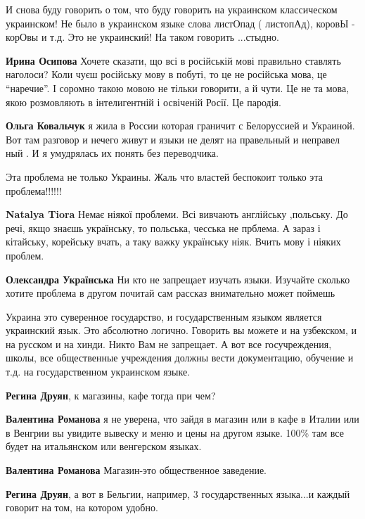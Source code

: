 
И снова буду говорить о том, что буду говорить на украинском классическом
украинском! Не было в украинском языке слова листОпад ( листопАд), коровЫ -
корОвы и т.д. Это не украинский! На таком говорить ...стыдно.

\begin{itemize}

\textbf{Ирина Осипова} Хочете сказати, що всі в російській мові правильно ставлять
наголоси? Коли чуєш російську мову в побуті, то це не російська мова, це
\enquote{наречие}. І соромно такою мовою не тільки говорити, а й чути. Це не та мова,
якою розмовляють в інтелигентній і освіченій Росії. Це пародія.


\textbf{Ольга Ковальчук} я жила в России которая граничит с Белоруссией и Украиной. Вот
там разговор и нечего живут и языки не делят на правельный и неправел ный . И я
умудрялась их понять без переводчика.

\end{itemize}


Эта проблема не только Украины. Жаль что властей беспокоит только эта проблема!!!!!!

\begin{itemize}
\textbf{Natalya Tiora} Немає ніякої проблеми. Всі вивчають англійську
,польську. До речі, якщо знаєшь українську, то польська, чесська не прблема. А
зараз і кітайську, корейську вчать, а таку важку українську ніяк. Вчить мову і
ніяких проблем.

\textbf{Олександра Українська} 
Ни кто не запрещает изучать языки. Изучайте сколько хотите
проблема в другом почитай сам рассказ внимательно может поймешь
\end{itemize}


Украина это суверенное государство, и государственным языком является
украинский язык. Это абсолютно логично. Говорить вы можете и на узбекском, и на
русском и на хинди. Никто Вам не запрещает. А вот все госучреждения, школы, все
общественные учреждения должны вести документацию, обучение и т.д. на
государственном украинском языке.

\begin{itemize}
\textbf{Регина Друян}, к магазины, кафе тогда при чем?


\textbf{Валентина Романова} я не уверена, что зайдя в магазин или в кафе в
Италии или в Венгрии вы увидите вывеску и меню и цены на другом языке. 100\% там
все будет на итальянском или венгерском языках.

\textbf{Валентина Романова} Магазин-это общественное заведение.

\textbf{Регина Друян}, а вот в Бельгии, например, 3 государственных языка...и каждый говорит на том, на котором удобно.
\end{itemize}

